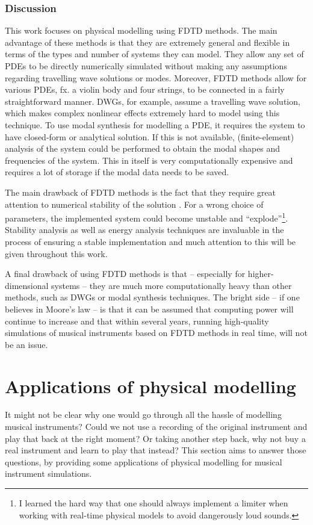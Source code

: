 \subsubsection{Discussion}
This work focuses on physical modelling using FDTD methods. The main advantage of these methods is that they are extremely general and flexible in terms of the types and number of systems they can model. They allow any set of PDEs to be directly numerically simulated without making any assumptions regarding travelling wave solutions or modes. Moreover, FDTD methods allow for various PDEs, fx. a violin body and four strings, to be connected in a fairly straightforward manner. DWGs, for example, assume a travelling wave solution, which makes complex nonlinear effects extremely hard to model using this technique. To use modal synthesis for modelling a PDE, it requires the system to have closed-form or analytical solution. If this is not available, (finite-element) analysis of the system could be performed to obtain the modal shapes and frequencies of the system. This in itself is very computationally expensive and requires a lot of storage if the modal data needs to be saved. 
 
The main drawback of FDTD methods is the fact that they require great attention to numerical stability of the solution \cite{theBible}. For a wrong choice of parameters, the implemented system could become unstable and ``explode''\footnote{I learned the hard way that one should always implement a limiter when working with real-time physical models to avoid dangerously loud sounds.}. Stability analysis as well as energy analysis techniques are invaluable in the process of ensuring a stable implementation and much attention to this will be given throughout this work.

A final drawback of using FDTD methods is that -- especially for higher-dimensional systems -- they are much more computationally heavy than other methods, such as DWGs or modal synthesis techniques. The bright side -- if one believes in Moore's law \cite{Moore1965} -- is that it can be assumed that computing power will continue to increase and that within several years, running high-quality simulations of musical instruments based on FDTD methods in real time, will not be an issue.

\section{Applications of physical modelling}\label{sec:why}
It might not be clear why one would go through all the hassle of modelling musical instruments? Could we not use a recording of the original instrument and play that back at the right moment? Or taking another step back, why not buy a real instrument and learn to play that instead? This section aims to answer those questions, by providing some applications of physical modelling for musical instrument simulations.  

